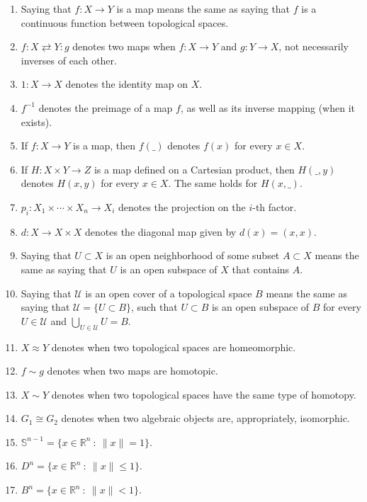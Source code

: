 \documentclass[12pt,oneside]{book}
\newcommand{\ds}{\displaystyle}
\newcommand{\R}{\mathbb{R}}
\begin{document}
    \begin{enumerate}
        \item Saying that $f:X\to Y$ is a map means the same as saying that $f$ is a continuous function 
        between topological spaces.
        \item $f:X \rightleftarrows Y:g$ denotes two maps when $f:X\to Y$ and $g:Y\to X$, not necessarily 
        inverses of each other. 
        \item $1:X\to X$ denotes the identity map on $X$.
        \item $f^{-1}$ denotes the preimage of a map $f$, as well as its inverse mapping (when it exists).
        \item If $f:X\to Y$ is a map, then $f(\_)$ denotes $f(x)$ for every $x\in X$.
        \item If $H:X\times Y\to Z$ is a map defined on a Cartesian product, then $H(\_,y)$ denotes 
        $H(x,y)$ for every $x\in X$. The same holds for $H(x,\_)$.
        \item $p_{i}:X_{1}\times \cdots\times X_{n}\to X_{i}$ denotes the projection on the $i$-th factor.
        \item $d:X\to X\times X$ denotes the diagonal map given by $d(x)=(x,x)$.
        \item Saying that $U\subset X$ is an open neighborhood of some subset $A\subset X$ means the 
        same as saying that $U$ is an open subspace of $X$ that contains $A$.
        \item Saying that $\mathcal{U}$ is an open cover of a topological space $B$ means the same as 
        saying that $\mathcal{U}=\{ U\subset B \}$, such that $U\subset B$ is an open subspace of $B$ 
        for every $U\in\mathcal{U}$ and $\ds\bigcup_{U\in\mathcal{U}}U=B$.  
        \item $X \approx Y$ denotes when two topological spaces are homeomorphic.
        \item $f \sim g$ denotes when two maps are homotopic.
        \item $X\sim Y$ denotes when two topological spaces have the same type of homotopy.
        \item $G_{1}\cong G_{2}$ denotes when two algebraic objects are, appropriately, isomorphic.
        \item $\mathbb{S}^{n-1}=\{ x\in\R^{n} \ : \ \| x \|=1 \}$.
        \item $D^{n}=\{ x\in\R^{n} \ : \ \| x \|\leq1 \}$.
        \item $B^{n}=\{ x\in\R^{n} \ : \ \| x \|<1 \}$.

\end{enumerate}
\end{document}
